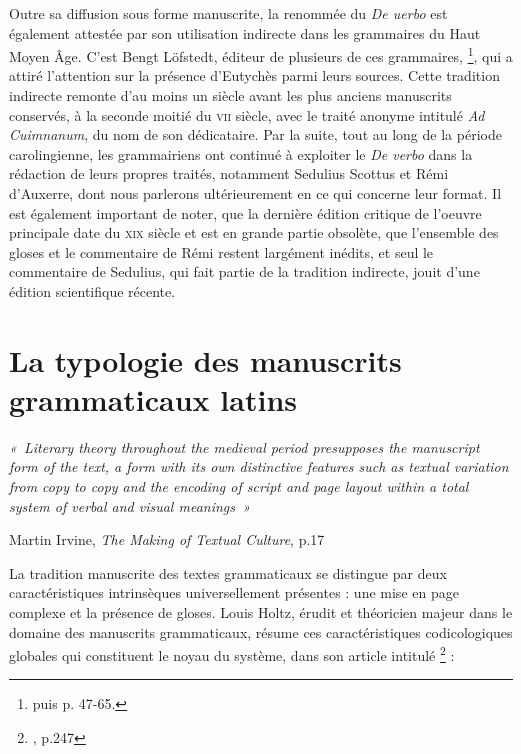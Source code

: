 \documentclass[a4paper, twoside, 12pt]{book}
\begin{document}
Outre sa diffusion sous forme manuscrite, la renommée du \textit{De uerbo} est également attestée par son utilisation indirecte dans les grammaires du Haut Moyen Âge. C'est Bengt Löfstedt, éditeur de plusieurs de ces grammaires,  \footnote{\cite{lofstedt1965der} puis \cite{lofstedt1972zu}p. 47-65.}, qui a attiré l'attention sur la présence d'Eutychès parmi leurs sources. Cette tradition indirecte remonte d'au moins un siècle avant les plus anciens manuscrits conservés, à la seconde moitié du \textsc{vii}\ieme{} siècle, avec le traité anonyme intitulé \textit{Ad Cuimnanum}, du nom de son dédicataire. Par la suite, tout au long de la période carolingienne, les grammairiens ont continué à exploiter le \textit{De verbo} dans la rédaction de leurs propres traités, notamment Sedulius Scottus et Rémi d'Auxerre, dont nous parlerons ultérieurement en ce qui concerne leur format. Il est également important de noter, que la dernière édition critique de l'oeuvre principale date du \textsc{xix}\ieme{} siècle et est en grande partie obsolète, que l'ensemble des gloses et le commentaire de Rémi restent largément inédits, et seul le commentaire de Sedulius, qui fait partie de la tradition indirecte, jouit d'une édition scientifique récente\cite{scottus1980donati}.\\

\section{La typologie des manuscrits grammaticaux latins}

\begin{flushright}\textit{ « Literary theory throughout the medieval period presupposes the manuscript form of the text, a form with its own distinctive features such as textual variation from copy to copy and the encoding of script and page layout within a total system of verbal and visual meanings »}\end{flushright}

\begin{flushright}Martin Irvine, \textit{The Making of Textual Culture}, p.17 \end{flushright}


La tradition manuscrite des textes grammaticaux se distingue par deux caractéristiques intrinsèques universellement présentes : une mise en page complexe et la présence de gloses. Louis Holtz, érudit et théoricien majeur dans le domaine des manuscrits grammaticaux, résume ces caractéristiques codicologiques globales qui constituent le noyau du système, dans son article intitulé \fg{} \footnote{\cite{holtz1978typologie}, p.247} :
\end{document}
